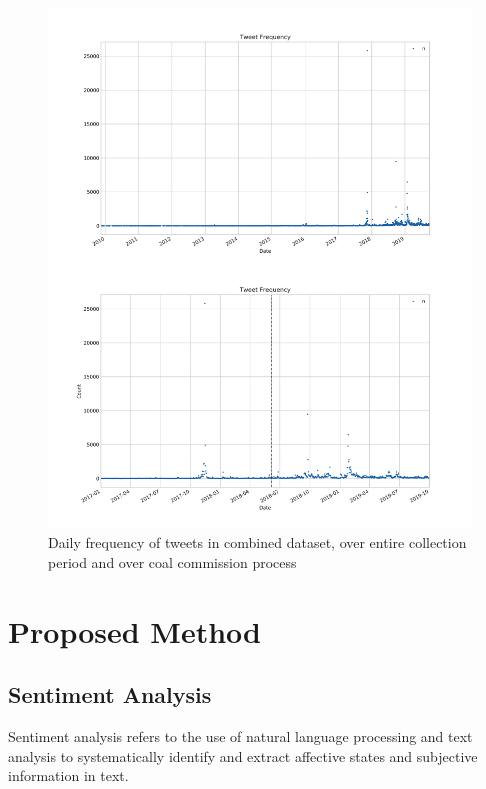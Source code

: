 \documentclass[9pt,twocolumn,twoside,lineno]{pnas-new}
\begin{document}
\begin{figure} 
	\begin{center}
		\includegraphics[width=\linewidth]{figures/tweet_frequency_combine}
	\end{center}
	\caption{Daily frequency of tweets in combined dataset, over entire collection period and over coal commission process}
	\label{fig:tweet_frequency}
\end{figure}

\section*{Proposed Method}
\subsection*{Sentiment Analysis}

Sentiment analysis refers to the use of natural language processing and text analysis to systematically identify and extract affective states and subjective information in text. %
\end{document}
